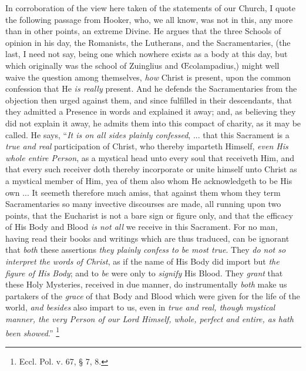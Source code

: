 In corroboration of the view here taken of the
statements of our Church, I quote the following passage from Hooker,
who, we all know, was not in this, any more than in other points, an
extreme Divine. He argues that the three Schools of opinion in his
day, the Romanists, the Lutherans, and the Sacramentaries, (the last,
I need not say, being one which nowhere exists as a body at this day,
but which originally was the school of Zuinglius and Œcolampadius,)
might well waive the question among themselves, \emph{how} Christ is
present, upon the common confession that He \emph{is really}
present. And he defends the Sacramentaries from the objection then
urged against them, and since fulfilled in their descendants, that
they admitted a Presence in words and explained it away; and, as
believing they did not explain it away, he admits them into this
compact of charity, as it may be called. He says, ``\emph{It is on all
sides plainly confessed}, ... that this Sacrament is a \emph{true and
real} participation of Christ, who thereby imparteth Himself, \emph{even
His whole entire Person}, as a mystical head unto every soul that
receiveth Him, and that every such receiver doth thereby incorporate
or unite himself unto Christ as a mystical member of Him, yea of them
also whom He acknowledgeth to be His own ... It seemeth therefore much
amiss, that against them whom they term Sacramentaries so many
invective discourses are made, all running upon two points, that the
Eucharist is not a bare sign or figure only, and that the efficacy of
His Body and Blood \emph{is not all} we receive in this Sacrament. For
no man, having read their books and writings which are thus traduced,
can be ignorant that \emph{both} these assertions \emph{they plainly
confess to be most true}. They \emph{do not so interpret the words of
Christ}, as if the name of His Body did import but \emph{the figure of
His Body}; and to \emph{be} were only to \emph{signify} His Blood.
They \emph{grant} that these Holy Mysteries, received in due manner,
do instrumentally \emph{both} make us partakers of the \emph{grace} of
that Body and Blood which were given for the life of the world, \emph{and
besides} also impart to us, even in \emph{true and real, though
mystical manner, the very Person of our Lord Himself, whole, perfect
and entire, as hath been showed}.'' \footnote{Eccl. Pol. v. 67, § 7, 8.}


